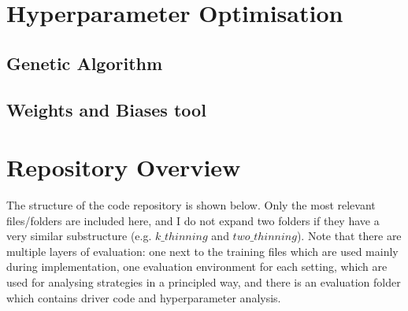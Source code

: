 
\section{Hyperparameter Optimisation}


\subsection{Genetic Algorithm}


\subsection{Weights and Biases tool}


\section{Repository Overview}

The structure of the code repository is shown below. Only the most relevant files/folders are included here, and I do not expand two folders if they have a very similar substructure (e.g. $k\_thinning$ and $two\_thinning$). Note that there are multiple layers of evaluation: one next to the training files which are used mainly during implementation, one evaluation environment for each setting, which are used for analysing strategies in a principled way, and there is an evaluation folder which contains driver code and hyperparameter analysis.




